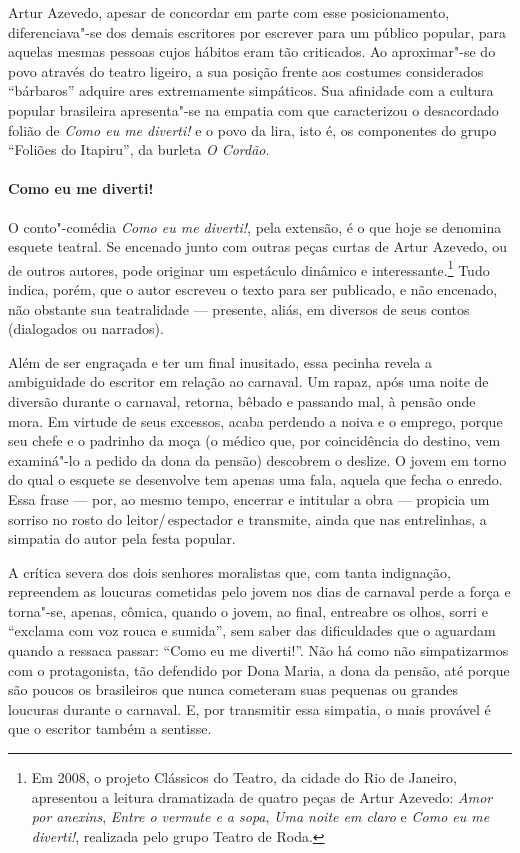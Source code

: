 Artur Azevedo, apesar de concordar em parte com esse posicionamento,
diferenciava"-se dos demais escritores por escrever para um público
popular, para aquelas mesmas pessoas cujos hábitos eram tão criticados.
Ao aproximar"-se do povo através do teatro ligeiro, a sua posição
frente aos costumes considerados “bárbaros” adquire ares extremamente
simpáticos. Sua afinidade com a cultura popular brasileira apresenta"-se
na empatia com que caracterizou o desacordado folião de \textit{Como eu
me diverti!} e o povo da lira, isto é, os componentes do grupo “Foliões
do Itapiru”, da burleta \textit{O Cordão}.

\paragraph{Como eu me diverti!}

O conto"-comédia \textit{Como eu me diverti!}, pela extensão, é o que
hoje se denomina esquete teatral. Se encenado junto com outras peças
curtas de Artur Azevedo, ou de outros autores, pode originar um
espetáculo dinâmico e interessante.\footnote{ Em 2008, o projeto
Clássicos do Teatro, da cidade do Rio de Janeiro, apresentou a leitura
dramatizada de quatro peças de Artur Azevedo: \textit{Amor por
anexins}, \textit{Entre o vermute e a sopa}, \textit{Uma noite em claro
}e \textit{Como eu me diverti!}, realizada pelo grupo Teatro de Roda.}
Tudo indica, porém, que o autor escreveu o texto para ser publicado, e
não encenado, não obstante sua teatralidade --- presente, aliás, em
diversos de seus contos (dialogados ou narrados).

Além de ser engraçada e ter um final inusitado, essa pecinha revela a
ambiguidade do escritor em relação ao carnaval. Um rapaz, após uma
noite de diversão durante o carnaval, retorna, bêbado e passando mal, à
pensão onde mora. Em virtude de seus excessos, acaba perdendo a noiva e
o emprego, porque seu chefe e o padrinho da moça (o médico que, por
coincidência do destino, vem examiná"-lo a pedido da dona da pensão)
descobrem o deslize. O jovem em torno do qual o esquete se desenvolve
tem apenas uma fala, aquela que fecha o enredo. Essa frase --- por,
ao mesmo tempo, encerrar e intitular a obra --- propicia um sorriso
no rosto do leitor/\,espectador e transmite, ainda que nas entrelinhas, a
simpatia do autor pela festa popular. 

A crítica severa dos dois senhores moralistas que, com tanta indignação,
repreendem as loucuras cometidas pelo jovem nos dias de carnaval perde
a força e torna"-se, apenas, cômica, quando o jovem, ao final, entreabre
os olhos, sorri e “exclama com voz rouca e sumida”, sem saber das
dificuldades que o aguardam quando a ressaca passar: “Como eu me
diverti!”. Não há como não simpatizarmos com o protagonista, tão
defendido por Dona Maria, a dona da pensão, até porque são poucos os
brasileiros que nunca cometeram suas pequenas ou grandes loucuras
durante o carnaval. E, por transmitir essa simpatia, o mais provável é
que o escritor também a sentisse.

